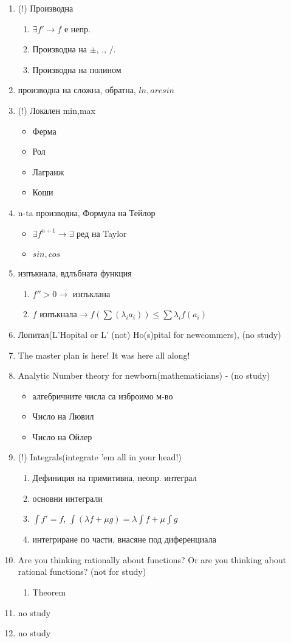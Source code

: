 \documentclass{article}
\begin{document}
\begin{enumerate}
	\item (!) Производна
	\begin{enumerate}
		\item $\exists f' \to f$ е непр.
		\item Производна на $\pm$,  $.$, $/$.
		\item Производна на полином
		
	\end{enumerate}
	\item производна на сложна, обратна, $ln, arcsin$
	\item (!) Локален min,max
	\begin{itemize}
		\item Ферма
		\item Рол
		\item Лагранж
		\item Коши
	\end{itemize}
	\item n-ta производна, Формула на Тейлор
	\begin{itemize}
		\item $\exists f^{n+1} \to \exists$ ред на Taylor 
		\item $ sin, cos$
	\end{itemize}
	\item изпъкнала, вдлъбната функция
	\begin{enumerate}
		\item $f''>0 \to$ изпъклана
		\item $f$ изпъкнала$\to f(\sum(\lambda_i a_i)) \leq \sum \lambda_i f(a_i) $
	\end{enumerate}
	\item Лопитал(L'Hopital or L' (not) Ho(s)pital for newcommers), (no study)
	\item The master plan is here! It was here all along!
	\item Analytic Number theory for newborn(mathematicians) - (no study)
	\begin{itemize}
		\item алгебричните числа са изброимо м-во
		\item Число на Лювил
		\item Число на Ойлер
	\end{itemize}
	\item (!) Integrals(integrate 
	'em all in your head!)
	\begin{enumerate}
		\item Дефиниция на примитивна, неопр. интеграл
		\item основни интеграли
		\item $\int f' = f$, $\int (\lambda f + \mu g) = \lambda \int f + \mu \int g $
		\item интегриране по части, внасяне под диференциала
	\end{enumerate}
	\item Are you thinking rationally about functions? Or are you thinking about rational functions? (not for study)
	\begin{enumerate}
		\item Theorem
	\end{enumerate}
	\item no study
	\item no study
	

\end{enumerate}
\end{document}
